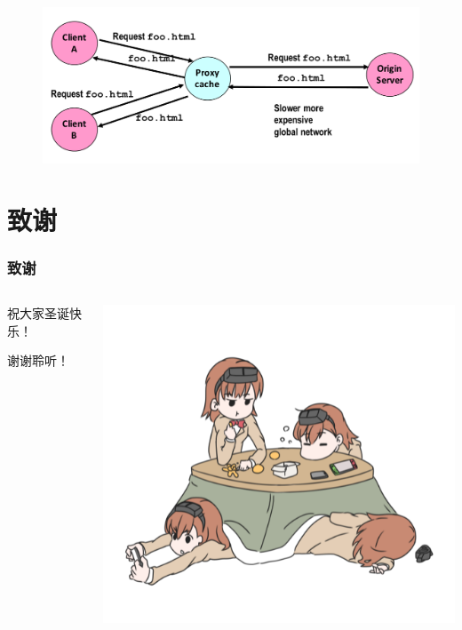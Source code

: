\documentclass[AutoFakeBold]{beamer}
\begin{document}
{\begin{frame}
\begin{figure}
            \includegraphics[width=.618\paperwidth]{figures/5.png}
        \end{figure}
    
    \end{frame}
    
    \section*{致谢}}

    \begin{frame}
        \frametitle{致谢}
        \begin{columns}
            \begin{column}{.5\linewidth}
                \begin{center}
                    祝大家圣诞快乐！
                
                    谢谢聆听！
                \end{center}
            \end{column}
            \begin{column}{.5\linewidth}
                \includegraphics[width=.4\paperwidth]{figures/misaka558.png}
            \end{column}
        \end{columns}
    \end{frame}
    
\end{document}
